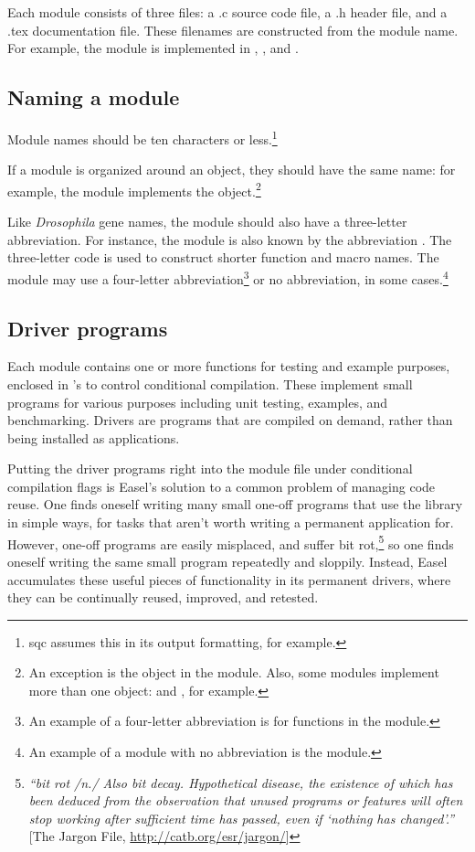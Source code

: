 Each module consists of three files: a .c source code file, a .h
header file, and a .tex documentation file. These filenames are
constructed from the module name. For example, the 
module is implemented in ,
, and .

\subsection{Naming a module}

Module names should be ten characters or less.\footnote{sqc assumes
  this in its output formatting, for example.}

If a module is organized around an object, they should have the same
name: for example, the  module implements the
 object.\footnote{An exception is the
 object in the  module. Also,
some modules implement more than one object:  and
, for example.}

Like \emph{Drosophila} gene names, the module should also have a
three-letter abbreviation. For instance, the  module
is also known by the abbreviation . The three-letter code
is used to construct shorter function and macro names. The module may
use a four-letter abbreviation\footnote{An example of a four-letter
abbreviation is  for functions in the
 module.}  or no abbreviation, in some
cases.\footnote{An example of a module with no abbreviation is the
 module.}

\subsection{Driver programs}

Each module contains one or more  functions for testing
and example purposes, enclosed in 's to control
conditional compilation. These  implement small
programs for various purposes including unit testing, examples, and
benchmarking. Drivers are programs that are compiled on demand, rather
than being installed as applications.

Putting the driver programs right into the module  file
under conditional compilation flags is Easel's solution to a common
problem of managing code reuse. One finds oneself writing many small
one-off programs that use the library in simple ways, for tasks that
aren't worth writing a permanent application for.  However, one-off
programs are easily misplaced, and suffer bit
rot,\footnote{\emph{``bit rot /n./ Also bit decay. Hypothetical
disease, the existence of which has been deduced from the observation
that unused programs or features will often stop working after
sufficient time has passed, even if `nothing has changed'.''} [The
Jargon File, \url{http://catb.org/esr/jargon/}]} so one finds oneself
writing the same small program repeatedly and sloppily.  Instead,
Easel accumulates these useful pieces of functionality in its
permanent drivers, where they can be continually reused, improved, and
retested.

